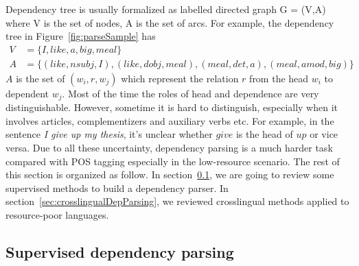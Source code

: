 \documentclass[12pt,twoside,final,hidelinks]{ltthesis}
\theoremstyle{definition}
\begin{document}
Dependency tree is usually formalized as labelled directed graph G = (V,A) where V is the set of nodes, A is the set of arcs. For example, the dependency tree in Figure~\ref{fig:parseSample} has 
\begin{align}
V &= \{I, like, a, big, meal\}\\
A &= \{(like, nsubj, I), (like, dobj, meal), (meal, det, a), (meal, amod, big)\} 
\end{align}
$A$ is the set of $(w_i,r,w_j)$ which represent the relation $r$ from the head $w_i$ to dependent $w_j$.%
Most of the time the roles of head and dependence are very distinguishable. However, sometime it is hard to distinguish, especially when it involves articles, complementizers and auxiliary verbs etc. For example, in the sentence \textit{I give up my thesis}, it's unclear whether $give$ is the head of $up$ or vice versa. Due to all these uncertainty, dependency parsing is a much harder task compared with POS tagging especially in the low-resource scenario. 
The rest of this section is organized as follow. In section~\ref{sec:monolingualDep}, we are going to review some supervised methods to build a dependency parser. In section~\ref{sec:crosslingualDepParsing}, we reviewed crosslingual methods applied to resource-poor languages. 

\subsection{Supervised dependency parsing}
\label{sec:monolingualDep}
\end{document}
